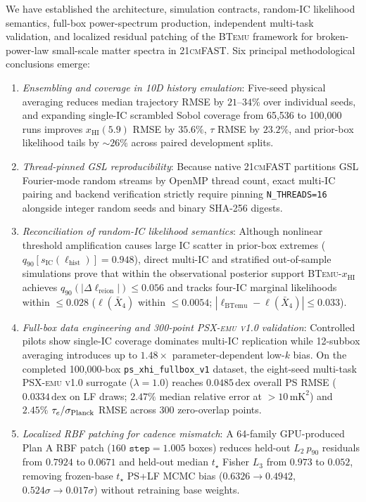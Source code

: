 \documentclass[aps,prd,reprint,superscriptaddress,nofootinbib,amsmath,amssymb,floatfix,longbibliography]{revtex4-2}
\begin{document}
We have established the architecture, simulation contracts, random-IC likelihood semantics, full-box power-spectrum production, independent multi-task validation, and localized residual patching of the \textsc{BTemu} framework for broken-power-law small-scale matter spectra in \textsc{21cmFAST}. Six principal methodological conclusions emerge:
\begin{enumerate}
\item \emph{Ensembling and coverage in 10D history emulation}: Five-seed physical averaging reduces median trajectory RMSE by $21\text{--}34\%$ over individual seeds, and expanding single-IC scrambled Sobol coverage from 65,536 to 100,000 runs improves $x_{\mathrm{HI}}(5.9)$ RMSE by $35.6\%$, $\tau$ RMSE by $23.2\%$, and prior-box likelihood tails by $\sim 26\%$ across paired development splits.
\item \emph{Thread-pinned GSL reproducibility}: Because native \textsc{21cmFAST} partitions GSL Fourier-mode random streams by OpenMP thread count, exact multi-IC pairing and backend verification strictly require pinning \texttt{N\_THREADS=16} alongside integer random seeds and binary SHA-256 digests.
\item \emph{Reconciliation of random-IC likelihood semantics}: Although nonlinear threshold amplification causes large IC scatter in prior-box extremes ($q_{90}[s_{\mathrm{IC}}(\ell_{\mathrm{hist}})] = 0.948$), direct multi-IC and stratified out-of-sample simulations prove that within the observational posterior support \textsc{BTemu}-$x_{\mathrm{HI}}$ achieves $q_{90}(|\Delta\ell_{\mathrm{reion}}|) \le 0.056$ and tracks four-IC marginal likelihoods within $\le 0.028$ ($\ell(\bar{X}_4)$ within $\le 0.0054$; $|\ell_{\mathrm{BTemu}}-\ell(\bar{X}_4)| \le 0.033$).
\item \emph{Full-box data engineering and 300-point \textsc{PSX-emu v1.0} validation}: Controlled pilots show single-IC coverage dominates multi-IC replication while 12-subbox averaging introduces up to $1.48\times$ parameter-dependent low-$k$ bias. On the completed 100,000-box \texttt{ps\_xhi\_fullbox\_v1} dataset, the eight-seed multi-task \textsc{PSX-emu v1.0} surrogate ($\lambda=1.0$) reaches $0.0485\,\mathrm{dex}$ overall PS RMSE ($0.0334\,\mathrm{dex}$ on LF draws; $2.47\%$ median relative error at $>10\,\mathrm{mK}^2$) and $2.45\%$ $\tau_e/\sigma_{\rm Planck}$ RMSE across 300 zero-overlap points.
\item \emph{Localized RBF patching for cadence mismatch}: A 64-family GPU-produced Plan A RBF patch ($160$ $\texttt{step}=1.005$ boxes) reduces held-out $L_2\ p_{90}$ residuals from $0.7924$ to $0.0671$ and held-out median $t_\star$ Fisher $L_3$ from $0.973$ to $0.052$, removing frozen-base $t_\star$ PS+LF MCMC bias ($0.6326 \to 0.4942$, $0.524\sigma \to 0.017\sigma$) without retraining base weights.

\end{enumerate}
\end{document}
